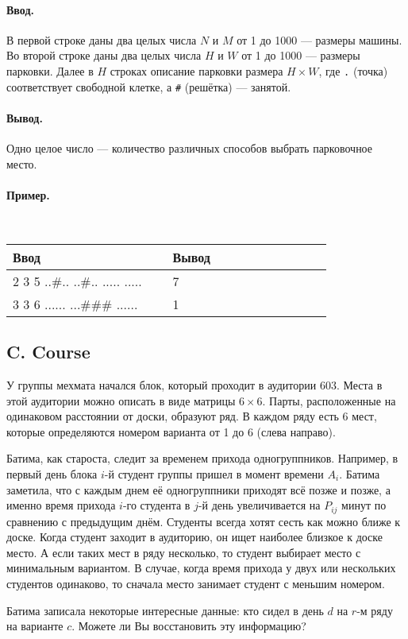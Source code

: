 \documentclass[12pt, a4paper]{article}
\newcommand{\informat}[1]
{
	\paragraph{Ввод.\\} #1
}
\newcommand{\outformat}[1]
{
	\paragraph{Вывод.\\} #1
}
\newcommand{\examplee}[4]
{
	\paragraph{Пример.\\}
	{\tt
	\begin{tabular}{|p{0.4\linewidth}|p{0.4\linewidth}|}
	\hline
	Ввод 	& Вывод  	\\
	\hline
	#1 		& #2 		\\
	\hline
	#3		& #4		\\
	\hline
	\end{tabular}
	}
}
\begin{document}
\informat{В первой строке даны два целых числа $N$ и $M$ от 1 до 1000 --- размеры машины. \newline 
Во второй строке даны два целых числа $H$ и $W$ от 1 до 1000 --- размеры парковки.\newline 
Далее в $H$ строках описание парковки размера $H \times W$, где {\tt .} (точка)  соответствует свободной клетке, а {\tt \#} (решётка) --- занятой.}

\outformat{Одно целое число --- количество различных способов выбрать парковочное место.}

\examplee
{2 3 \newline
4 5 \newline
..\#.. \newline
..\#.. \newline
..... \newline
.....}
{7}
{3 3 \newline
3 6 \newline
...... \newline
...\#\#\# \newline
......}
{1}



\subsection*{C. Course}


У группы мехмата начался блок, который проходит в аудитории $603$. Места в этой аудитории можно описать в виде матрицы $6 \times 6$. Парты, расположенные на одинаковом расстоянии от доски, образуют ряд. В каждом ряду есть 6 мест, которые определяются номером варианта от 1 до 6 (слева направо).

Батима, как староста, следит за временем прихода одногруппников. Например, в первый день блока $i$-й студент группы пришел в момент времени $A_i$. Батима заметила, что с каждым днем её одногруппники приходят всё позже и позже, а именно время прихода $i$-го студента в $j$-й день увеличивается на $P_{ij}$ минут по сравнению с предыдущим днём. Студенты всегда хотят сесть как можно ближе к доске. Когда студент заходит в аудиторию, он ищет наиболее близкое к доске место. А если таких мест в ряду несколько, то студент выбирает место с минимальным вариантом. В случае, когда время прихода у двух или нескольких студентов одинаково, то сначала место занимает студент с меньшим номером. 

Батима записала некоторые интересные данные: кто сидел в день $d$ на $r$-м ряду на варианте $c$. Можете ли Вы восстановить эту информацию?
\end{document}
